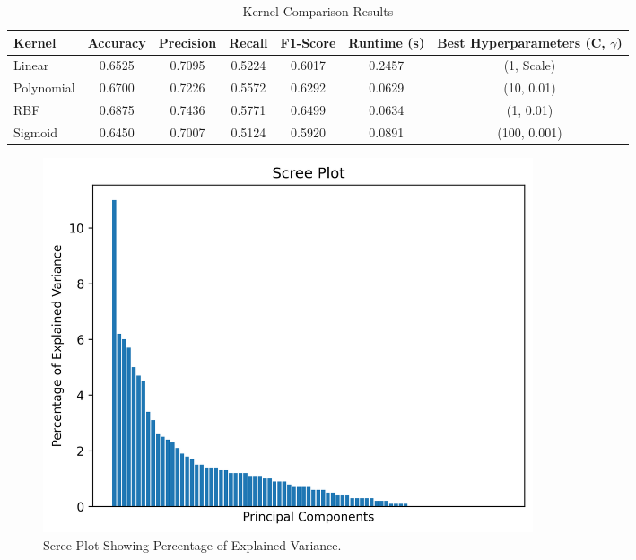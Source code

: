 \documentclass{article}
\begin{document}
\begin{table}[H]
\centering
\caption{Kernel Comparison Results}
\label{kernel-results}
\begin{tabular}{@{}lcccccc@{}}
\toprule
\textbf{Kernel} & \textbf{Accuracy} & \textbf{Precision} & \textbf{Recall} & \textbf{F1-Score} & \textbf{Runtime (s)} & \textbf{Best Hyperparameters (C, $\gamma$)} \\ \midrule
Linear          & 0.6525            & 0.7095             & 0.5224          & 0.6017            & 0.2457              & (1, Scale)                                    \\ 
Polynomial      & 0.6700            & 0.7226             & 0.5572          & 0.6292            & 0.0629              & (10, 0.01)                                   \\ 
RBF             & 0.6875            & 0.7436             & 0.5771          & 0.6499            & 0.0634              & (1, 0.01)                                    \\ 
Sigmoid         & 0.6450            & 0.7007             & 0.5124          & 0.5920            & 0.0891              & (100, 0.001)                                 \\ \bottomrule
\end{tabular}
\end{table}

\begin{figure}[H]
    \centering
    \includegraphics[width=0.7\textwidth]{../figures/scree_plot.png}
    \caption{Scree Plot Showing Percentage of Explained Variance.}
    \label{fig:scree-plot}
\end{figure}
\end{document}
